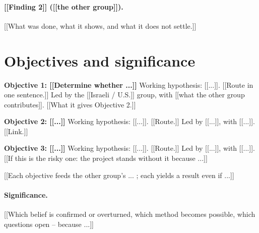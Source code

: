 \documentclass[12pt,a4paper]{article}
\begin{document}
\paragraph{[[Finding 2]] ([[the other group]]).}
[[What was done, what it shows, and what it does not settle.]]

\section{Objectives and significance}

\textbf{Objective 1: [[Determine whether ...]]} Working hypothesis: [[...]]. [[Route in one
sentence.]] Led by the [[Israeli / U.S.]] group, with [[what the other group contributes]].
[[What it gives Objective 2.]]

\textbf{Objective 2: [[...]]} Working hypothesis: [[...]]. [[Route.]] Led by [[...]], with
[[...]]. [[Link.]]

\textbf{Objective 3: [[...]]} Working hypothesis: [[...]]. [[Route.]] Led by [[...]], with
[[...]]. [[If this is the risky one: the project stands without it because ...]]

[[Each objective feeds the other group's ... ; each yields a result even if ...]]

\paragraph{Significance.} [[Which belief is confirmed or overturned, which method becomes
possible, which questions open -- because ...]]
\end{document}
